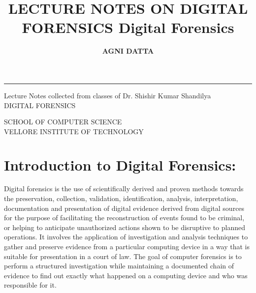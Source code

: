 \documentclass[british]{article}
\begin{document}
\medskip{}

\title{\textbf{\Huge{}LECTURE NOTES ON DIGITAL FORENSICS}{\Huge{}\vfill{}
	}Digital Forensics}
\author{{\LARGE{}\vspace{1.5cm}
		}\textbf{\LARGE{}AGNI DATTA}}
\maketitle
\begin{center}
	{\LARGE{}\vfill{}
	}{\LARGE\par}
	\par\end{center}

\begin{center}
	{\Huge{}\rule[0.5ex]{0.5\columnwidth}{0.5pt}}{\Huge\par}
	\par\end{center}

\begin{center}
	{\LARGE{}Lecture Notes collected from classes of Dr. Shishir Kumar
		Shandilya}\\
	{\LARGE{} DIGITAL FORENSICS}{\LARGE\par}
	\par\end{center}

\begin{center}
	{\LARGE{}\vfill{}
	}{\Large{}SCHOOL OF COMPUTER SCIENCE}\\
	{\Large{} VELLORE INSTITUTE OF TECHNOLOGY}\\
	{\Large{} \vfill{}
	}\pagebreak\tableofcontents{}
	\par\end{center}

\newpage{}

\part{Introduction to Digital Forensics:}

Digital forensics is the use of scientifically derived and proven
methods towards the preservation, collection, validation, identification,
analysis, interpretation, documentation and presentation of digital
evidence derived from digital sources for the purpose of facilitating
the reconstruction of events found to be criminal, or helping to anticipate
unauthorized actions shown to be disruptive to planned operations.
It involves the application of investigation and analysis techniques
to gather and preserve evidence from a particular computing device
in a way that is suitable for presentation in a court of law. The
goal of computer forensics is to perform a structured investigation
while maintaining a documented chain of evidence to find out exactly
what happened on a computing device and who was responsible for it.
\end{document}
